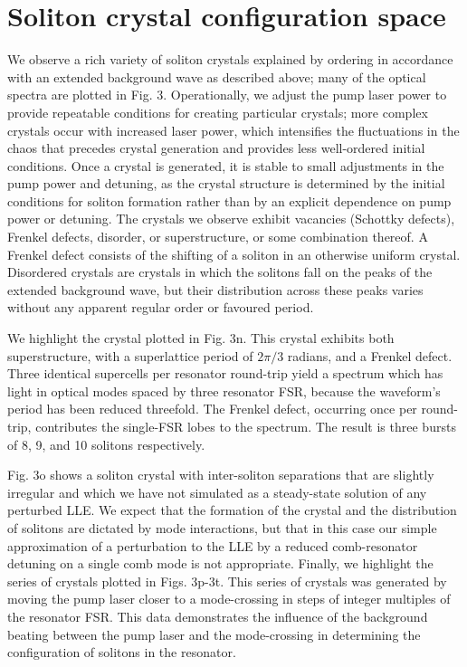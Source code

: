  
\section{Soliton crystal configuration space}\label{SCtaxonomy}

We observe a rich variety of soliton crystals explained by ordering in accordance with an extended background wave as described above; many of the optical spectra are plotted in Fig. 3. Operationally, we adjust the pump laser power to provide repeatable conditions for creating particular crystals; more complex crystals occur with increased laser power, which intensifies the fluctuations in the chaos that precedes crystal generation and provides less well-ordered initial conditions. Once a crystal is generated, it is stable to small adjustments in the pump power and detuning, as the crystal structure is determined by the initial conditions for soliton formation rather than by an explicit dependence on pump power or detuning. The crystals we observe exhibit vacancies (Schottky defects)\cite{27}, Frenkel defects\cite{27}, disorder, or superstructure, or some combination thereof. A Frenkel defect consists of the shifting of a soliton in an otherwise uniform crystal. Disordered crystals are crystals in which the solitons fall on the peaks of the extended background wave, but their distribution across these peaks varies without any apparent regular order or favoured period. 

We highlight the crystal plotted in Fig. 3n. This crystal exhibits both superstructure, with a superlattice period of $2\pi/3$ radians, and a Frenkel defect. Three identical supercells per resonator round-trip yield a spectrum which has light in optical modes spaced by three resonator FSR, because the waveform’s period has been reduced threefold. The Frenkel defect, occurring once per round-trip, contributes the single-FSR lobes to the spectrum. The result is three bursts of 8, 9, and 10 solitons respectively. 	

Fig. 3o shows a soliton crystal with inter-soliton separations that are slightly irregular and which we have not simulated as a steady-state solution of any perturbed LLE. We expect that the formation of the crystal and the distribution of solitons are dictated by mode interactions, but that in this case our simple approximation of a perturbation to the LLE by a reduced comb-resonator detuning on a single comb mode is not appropriate.
Finally, we highlight the series of crystals plotted in Figs. 3p-3t. This series of crystals was generated by moving the pump laser closer to a mode-crossing in steps of integer multiples of the resonator FSR. This data demonstrates the influence of the background beating between the pump laser and the mode-crossing in determining the configuration of solitons in the resonator.


